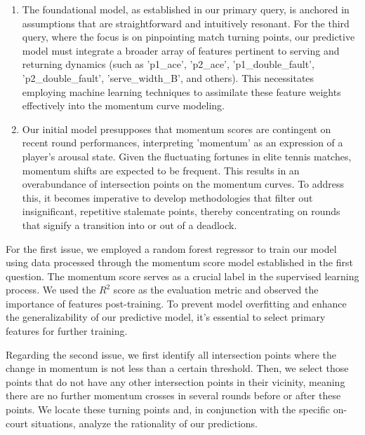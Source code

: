 \documentclass[12pt]{article}  %
\begin{document}
\begin{enumerate}
    \item The foundational model, as established in our primary query, 
    is anchored in assumptions that are straightforward and intuitively resonant. For the third query, 
    where the focus is on pinpointing match turning points, our predictive model must integrate a broader
    array of features pertinent to serving and returning dynamics 
    (such as 'p1\_ace', 'p2\_ace', 'p1\_double\_fault', 'p2\_double\_fault', 'serve\_width\_B', and others).
    This necessitates employing machine learning techniques to assimilate these feature weights effectively into the momentum curve modeling.

    \item Our initial model presupposes that momentum scores are contingent
     on recent round performances, interpreting 'momentum' as an expression
      of a player's arousal state. Given the fluctuating fortunes in elite 
      tennis matches, momentum shifts are expected to be frequent. This results
       in an overabundance of intersection points on the momentum curves. 
       To address this, it becomes imperative to develop methodologies that 
       filter out insignificant, repetitive stalemate points, thereby 
       concentrating on rounds that signify a transition into or out of a deadlock.
\end{enumerate}

For the first issue, we employed a random forest regressor to train 
our model using data processed through the momentum score model 
established in the first question. The momentum score serves as a 
crucial label in the supervised learning process. We used the $R^{2}$
score as the evaluation metric and observed the importance of features
 post-training. To prevent model overfitting and enhance the 
 generalizability of our predictive model, it's essential to select
  primary features for further training.

Regarding the second issue, we first identify all intersection 
points where the change in momentum is not less than a certain threshold. 
Then, we select those points that do not have any other intersection
points in their vicinity, meaning there are no further momentum 
crosses in several rounds before or after these points. We locate
these turning points and, in conjunction with the specific on-court
situations, analyze the rationality of our predictions.
\end{document}
